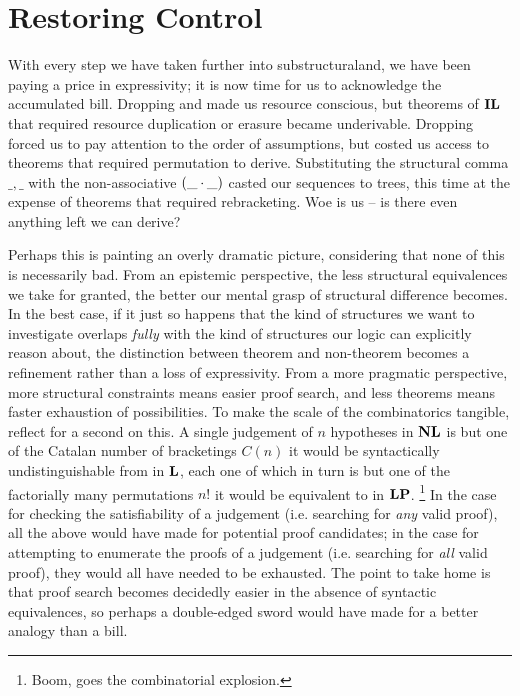 
\section{Restoring Control}\label{section:modalities}
With every step we have taken further into substructuraland, we have been paying a price in expressivity; it is now time for us to acknowledge the accumulated bill.
Dropping \Contraction{} and \Weakening{} made us resource conscious, but theorems of $\textbf{IL}$ that required resource duplication or erasure became underivable.
Dropping \Exchange{} forced us to pay attention to the order of assumptions, but costed us access to theorems that required permutation to derive.
Substituting the structural comma $\_,\_$ with the non-associative $(\_\mkern-0.5mu\cdot\mkern-0.5mu \_)$ casted our sequences to trees, this time at the expense of theorems that required rebracketing.
Woe is us -- is there even anything left we can derive?

Perhaps this is painting an overly dramatic picture, considering that none of this is necessarily bad.
From an epistemic perspective, the less structural equivalences we take for granted, the better our mental grasp of structural difference becomes.
In the best case, if it just so happens that the kind of structures we want to investigate overlaps \textit{fully} with the kind of structures our logic can explicitly reason about, the distinction between theorem and non-theorem becomes a refinement rather than a loss of expressivity.
From a more pragmatic perspective, more structural constraints means easier proof search, and less theorems means faster exhaustion of possibilities.
To make the scale of the combinatorics tangible, reflect for a second on this.
A single judgement of $n$ hypotheses in $\textbf{NL}$ is but one of the Catalan number of bracketings $C(n)$ it would be syntactically undistinguishable from in $\textbf{L}$, each one of which in turn is but one of the factorially many permutations $n!$ it would be equivalent to in $\textbf{LP}$.%
\footnote{Boom, goes the combinatorial explosion.}
In the case for checking the satisfiability of a judgement (i.e. searching for \textit{any} valid proof), all the above would have made for potential proof candidates;
in the case for attempting to enumerate the proofs of a judgement (i.e. searching for \textit{all} valid proof), they would all have needed to be exhausted.
The point to take home is that proof search becomes decidedly easier in the absence of syntactic equivalences, so perhaps a double-edged sword would have made for a better analogy than a bill.


